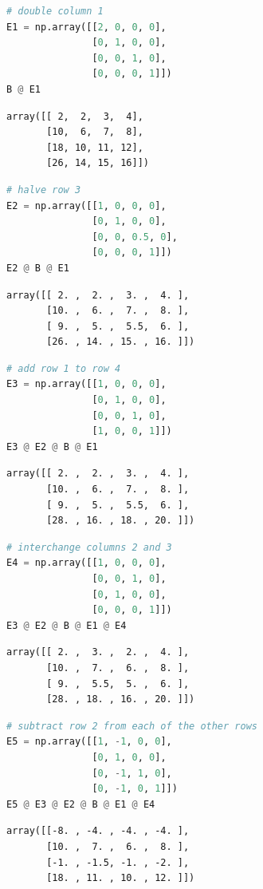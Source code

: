 \documentclass[11pt,letterpaper]{article}
\begin{document}
\begin{enumerate}
\begin{enumerate}
\begin{lstlisting}[language=python]
# double column 1
E1 = np.array([[2, 0, 0, 0],
               [0, 1, 0, 0],
               [0, 0, 1, 0],
               [0, 0, 0, 1]])
B @ E1
\end{lstlisting}
\begin{verbatim}
array([[ 2,  2,  3,  4],
       [10,  6,  7,  8],
       [18, 10, 11, 12],
       [26, 14, 15, 16]])
\end{verbatim}
\begin{lstlisting}[language=python]
# halve row 3
E2 = np.array([[1, 0, 0, 0],
               [0, 1, 0, 0],
               [0, 0, 0.5, 0],
               [0, 0, 0, 1]])
E2 @ B @ E1
\end{lstlisting}
\begin{verbatim}
array([[ 2. ,  2. ,  3. ,  4. ],
       [10. ,  6. ,  7. ,  8. ],
       [ 9. ,  5. ,  5.5,  6. ],
       [26. , 14. , 15. , 16. ]])
\end{verbatim}
\begin{lstlisting}[language=python]
# add row 1 to row 4
E3 = np.array([[1, 0, 0, 0],
               [0, 1, 0, 0],
               [0, 0, 1, 0],
               [1, 0, 0, 1]])
E3 @ E2 @ B @ E1
\end{lstlisting}
\begin{verbatim}
array([[ 2. ,  2. ,  3. ,  4. ],
       [10. ,  6. ,  7. ,  8. ],
       [ 9. ,  5. ,  5.5,  6. ],
       [28. , 16. , 18. , 20. ]])
\end{verbatim}
\begin{lstlisting}[language=python]
# interchange columns 2 and 3
E4 = np.array([[1, 0, 0, 0],
               [0, 0, 1, 0],
               [0, 1, 0, 0],
               [0, 0, 0, 1]])
E3 @ E2 @ B @ E1 @ E4
\end{lstlisting}
\begin{verbatim}
array([[ 2. ,  3. ,  2. ,  4. ],
       [10. ,  7. ,  6. ,  8. ],
       [ 9. ,  5.5,  5. ,  6. ],
       [28. , 18. , 16. , 20. ]])
\end{verbatim}
\begin{lstlisting}[language=python]
# subtract row 2 from each of the other rows
E5 = np.array([[1, -1, 0, 0],
               [0, 1, 0, 0],
               [0, -1, 1, 0],
               [0, -1, 0, 1]])
E5 @ E3 @ E2 @ B @ E1 @ E4
\end{lstlisting}
\begin{verbatim}
array([[-8. , -4. , -4. , -4. ],
       [10. ,  7. ,  6. ,  8. ],
       [-1. , -1.5, -1. , -2. ],
       [18. , 11. , 10. , 12. ]])
\end{verbatim}
\begin{lstlisting}[language=python]

\end{lstlisting}
\end{enumerate}
\end{enumerate}
\end{document}

